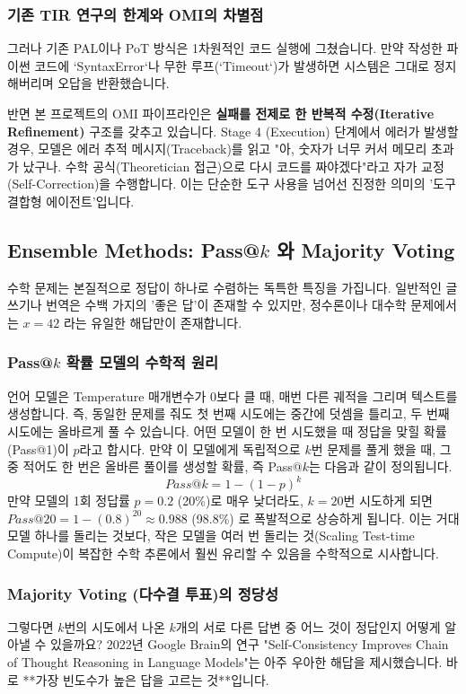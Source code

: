 \subsubsection{기존 TIR 연구의 한계와 OMI의 차별점}
그러나 기존 PAL이나 PoT 방식은 1차원적인 코드 실행에 그쳤습니다. 만약 작성한 파이썬 코드에 `SyntaxError`나 무한 루프(`Timeout`)가 발생하면 시스템은 그대로 정지해버리며 오답을 반환했습니다. 

반면 본 프로젝트의 OMI 파이프라인은 \textbf{실패를 전제로 한 반복적 수정(Iterative Refinement)} 구조를 갖추고 있습니다. Stage 4 (Execution) 단계에서 에러가 발생할 경우, 모델은 에러 추적 메시지(Traceback)를 읽고 "아, 숫자가 너무 커서 메모리 초과가 났구나. 수학 공식(Theoretician 접근)으로 다시 코드를 짜야겠다"라고 자가 교정(Self-Correction)을 수행합니다. 이는 단순한 도구 사용을 넘어선 진정한 의미의 '도구 결합형 에이전트'입니다.

\subsection{Ensemble Methods: Pass@$k$ 와 Majority Voting}
수학 문제는 본질적으로 정답이 하나로 수렴하는 독특한 특징을 가집니다. 일반적인 글쓰기나 번역은 수백 가지의 '좋은 답'이 존재할 수 있지만, 정수론이나 대수학 문제에서는 $x=42$ 라는 유일한 해답만이 존재합니다.

\subsubsection{Pass@$k$ 확률 모델의 수학적 원리}
언어 모델은 Temperature 매개변수가 0보다 클 때, 매번 다른 궤적을 그리며 텍스트를 생성합니다. 즉, 동일한 문제를 줘도 첫 번째 시도에는 중간에 덧셈을 틀리고, 두 번째 시도에는 올바르게 풀 수 있습니다. 어떤 모델이 한 번 시도했을 때 정답을 맞힐 확률(Pass@1)이 $p$라고 합시다. 만약 이 모델에게 독립적으로 $k$번 문제를 풀게 했을 때, 그 중 적어도 한 번은 올바른 풀이를 생성할 확률, 즉 Pass@$k$는 다음과 같이 정의됩니다.
\begin{equation}
Pass@k = 1 - (1 - p)^k
\end{equation}
만약 모델의 1회 정답률 $p = 0.2$ (20\%)로 매우 낮더라도, $k=20$번 시도하게 되면 $Pass@20 = 1 - (0.8)^{20} \approx 0.988$ (98.8\%) 로 폭발적으로 상승하게 됩니다. 이는 거대 모델 하나를 돌리는 것보다, 작은 모델을 여러 번 돌리는 것(Scaling Test-time Compute)이 복잡한 수학 추론에서 훨씬 유리할 수 있음을 수학적으로 시사합니다.

\subsubsection{Majority Voting (다수결 투표)의 정당성}
그렇다면 $k$번의 시도에서 나온 $k$개의 서로 다른 답변 중 어느 것이 정답인지 어떻게 알아낼 수 있을까요? 2022년 Google Brain의 연구 "Self-Consistency Improves Chain of Thought Reasoning in Language Models"는 아주 우아한 해답을 제시했습니다. 바로 **가장 빈도수가 높은 답을 고르는 것**입니다.

